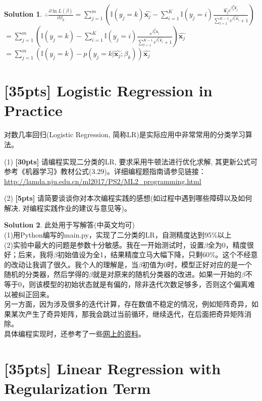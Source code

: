 \documentclass[a4paper,UTF8]{article}
\numberwithin{equation}{section}
\theoremstyle{definition}
\newtheorem*{solution}{Solution}
\begin{document}
\begin{solution}
$\therefore \frac{\partial \ln{L(\beta)}}{\partial \beta_k} = \sum_{j=1}^m (\mathbb{I}(y_j=k)\hat{\mathbf x_j} - \sum_{i=1}^K\mathbb{I}(y_j=i)\frac{\hat{\mathbf x_j}e^{\beta_k^T \hat{\mathbf x_j}}}{\sum_{l=1}^{K-1} e^{\beta^T_l \hat{\mathbf x_j}} + 1}  )$ \\
$ = \sum_{j=1}^m (\mathbb{I}(y_j=k) - \sum_{i=1}^K\mathbb{I}(y_j=i)\frac{e^{\beta_k^T \hat{\mathbf x_j}}}{\sum_{l=1}^{K-1} e^{\beta^T_l \hat{\mathbf x_j}} + 1})\hat{\mathbf x_j}$\\
$ = \sum_{j=1}^m (\mathbb{I}(y_j=k) - p(y_j=k|\hat{\mathbf x_j};\beta_k))\hat{\mathbf x_j} $
\end{solution}

\section{[35pts] Logistic Regression in Practice} 
对数几率回归(Logistic Regression, 简称LR)是实际应用中非常常用的分类学习算法。

(1) \textbf{[30pts]} 请编程实现二分类的LR, 要求采用牛顿法进行优化求解, 其更新公式可参考《机器学习》教材公式(3.29)。详细编程题指南请参见链接：\url{http://lamda.nju.edu.cn/ml2017/PS2/ML2_programming.html}

(2) \textbf{[5pts]} 请简要谈谈你对本次编程实践的感想(如过程中遇到哪些障碍以及如何解决, 对编程实践作业的建议与意见等)。
\begin{solution}
此处用于写解答(中英文均可)\\
(1)用Python编写的main.py，实现了二分类的LR，自测精度达到95\%以上\\
(2)实验中最大的问题是参数十分敏感。我在一开始测试时，设置$\beta$全为0，精度很好；后来，我将$\beta$初始值设为全1，结果精度立马大幅下降，只剩60\%。这个不经意的改动让我调了很久。我个人的理解是，当$\beta$初值为0时，模型正好对应的是一个随机的分类器，然后学得的$\beta$就是对原来的随机分类器的改进。如果一开始的$\beta$不等于0，则该模型的初始状态就是有偏的，除非迭代次数足够多，否则这个偏离难以被纠正回来。\\
另一方面，因为涉及很多的迭代计算，存在数值不稳定的情况，例如矩阵奇异，如果某次产生了奇异矩阵，那我会跳过当前循环，继续迭代，在后面把奇异矩阵消除。\\
具体编程实现时，还参考了一些\href{https://github.com/deerishi/Logistic-Regression-Convergence-Analysis/blob/master/logistic2.py}{网上的资料}。
\end{solution}


\section{[35pts] Linear Regression with Regularization Term}
\end{document}
